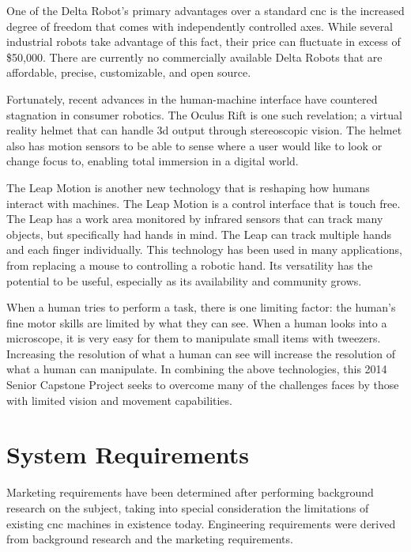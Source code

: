 One of the Delta Robot's primary advantages over a standard \gls{cnc} is the increased degree of freedom that comes with independently controlled axes.
While several industrial robots take advantage of this fact, their price can fluctuate in excess of \$50,000.
There are currently no commercially available Delta Robots that are affordable, precise, customizable, and open source.

Fortunately, recent advances in the human-machine interface have countered stagnation in consumer robotics.
The Oculus Rift is one such revelation; a virtual reality helmet that can handle \gls{3d} output through stereoscopic vision.
The helmet also has motion sensors to be able to sense where a user would like to look or change focus to, enabling total immersion in a digital world.

The Leap Motion is another new technology that is reshaping how humans interact with machines.
The Leap Motion is a control interface that is touch free.
The Leap has a work area monitored by infrared sensors that can track many objects, but specifically had hands in mind.
The Leap can track multiple hands and each finger individually.
This technology has been used in many applications, from replacing a mouse to controlling a robotic hand.
Its versatility has the potential to be useful, especially as its availability and community grows.

When a human tries to perform a task, there is one limiting factor: the human's fine motor skills are limited by what they can see.
When a human looks into a microscope, it is very easy for them to manipulate small items with tweezers.
Increasing the resolution of what a human can see will increase the resolution of what a human can manipulate.
In combining the above technologies, this 2014 Senior Capstone Project seeks to overcome many of the challenges faces by those with limited vision and movement capabilities.

\section{System Requirements}
Marketing requirements have been determined after performing background research on the subject, taking into special consideration the limitations of existing \gls{cnc} machines in existence today. Engineering requirements were derived from background research and the marketing requirements. 


